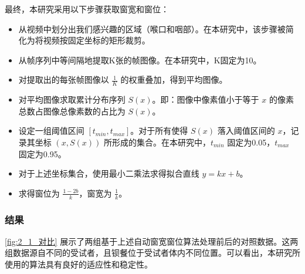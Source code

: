 最终，本研究采用以下步骤获取窗宽和窗位：
\begin{itemize}
    \item 从视频中划分出我们感兴趣的区域（喉口和咽部）。在本研究中，该步骤被简化为将视频按固定坐标的矩形裁剪。
    \item 从帧序列中等间隔地提取K张的帧图像。在本研究中，K固定为10。
    \item 对提取出的每张帧图像以 $\frac{1}{K}$ 的权重叠加，得到平均图像。
    \item 对平均图像求取累计分布序列 $S(x)$。即：图像中像素值小于等于 $x$ 的像素总数占图像总像素数的占比为 $S(x)$。
    \item 设定一组阈值区间 $[t_{min}, t_{max}]$。对于所有使得 $S(x)$ 落入阈值区间的 $x$，记录其坐标 $(x, S(x))$ 所形成的集合。在本研究中，$t_{min}$ 固定为0.05，$t_{max}$ 固定为0.95。
    \item 对于上述坐标集合，使用最小二乘法求得拟合直线 $y=kx+b$。
    \item 求得窗位为 $\frac{1-2b}{k}$，窗宽为 $\frac{1}{k}$。
\end{itemize}

\subsubsection{结果}

\cref{fig:2_1_对比} 展示了两组基于上述自动窗宽窗位算法处理前后的对照数据。这两组数据源自不同的受试者，且钡餐位于受试者体内不同位置。可以看出，本研究所使用的算法具有良好的适应性和稳定性。

